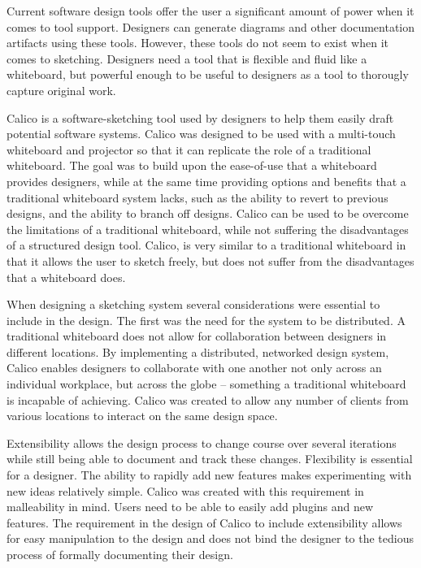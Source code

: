 Current software design tools offer the user a significant amount of power when it comes to tool support. Designers can generate diagrams and other documentation artifacts using these tools. However, these tools do not seem to exist when it comes to sketching. Designers need a tool that is flexible and fluid like a whiteboard, but powerful enough to be useful to designers as a tool to thorougly capture original work.  

Calico is a software-sketching tool used by designers to help them easily draft potential software systems. Calico was designed to be used with a multi-touch whiteboard and projector so that it can replicate the role of a traditional whiteboard. The goal was to build upon the ease-of-use that a whiteboard provides designers, while at the same time providing options and benefits that a traditional whiteboard system lacks, such as the ability to revert to previous designs, and the ability to branch off designs. Calico can be used to be overcome the limitations of a traditional whiteboard, while not suffering the disadvantages of a structured design tool. Calico, is very similar to a traditional whiteboard in that it allows the user to sketch freely, but does not suffer from the disadvantages that a whiteboard does. 

When designing a sketching system several considerations were essential to include in the design. The first was the need for the system to be distributed. A traditional whiteboard does not allow for collaboration between designers in different locations. By implementing a distributed, networked design system, Calico enables designers to collaborate with one another not only across an individual workplace, but across the globe -- something a traditional whiteboard is incapable of achieving. Calico was created to allow any number of clients from various locations to interact on the same design space.

Extensibility allows the design process to change course over several iterations while still being able to document and track these changes. Flexibility is essential for a designer. The ability to rapidly add new features makes experimenting with new ideas relatively simple. Calico was created with this requirement in malleability in mind. Users need to be able to easily add plugins and new features.
The requirement in the design of Calico to include extensibility allows for easy manipulation to the design and does not bind the designer to the tedious process of formally documenting their design.

